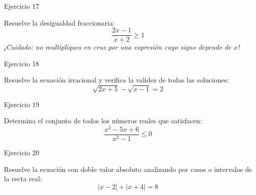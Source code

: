 \documentclass[aspectratio=169]{beamer}
\begin{document}
\begin{frame}{Ejercicio 17}
  \begin{mwejercicio}
    Resuelve la desigualdad fraccionaria:
    $$\frac{2x - 1}{x + 2} \ge 1$$
    \emph{¡Cuidado: no multipliques en cruz por una expresión cuyo signo depende de $x$!}
  \end{mwejercicio}
  \vspace{3.5cm}
\end{frame}
\begin{frame}{Ejercicio 18}
  \begin{mwejercicio}
    Resuelve la ecuación irracional y verifica la validez de todas las soluciones:
    $$\sqrt{2x + 5} - \sqrt{x - 1} = 2$$
  \end{mwejercicio}
  \vspace{3.5cm}
\end{frame}
\begin{frame}{Ejercicio 19}
  \begin{mwejercicio}
    Determina el conjunto de todos los números reales que satisfacen:
    $$\frac{x^2 - 5x + 6}{x^2 - 1} \le 0$$
  \end{mwejercicio}
  \vspace{3.5cm}
\end{frame}
\begin{frame}{Ejercicio 20}
  \begin{mwejercicio}
    Resuelve la ecuación con doble valor absoluto analizando por casos o intervalos de la recta real:
    $$|x - 2| + |x + 4| = 8$$
  \end{mwejercicio}
  \vspace{3.5cm}
\end{frame}
\end{document}

